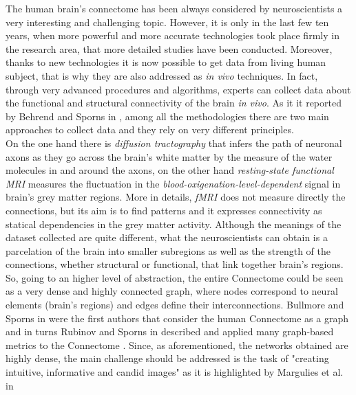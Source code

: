 \documentclass{article}
\begin{document}
\begin{multicols}{2}
The human brain's connectome has been always considered by neuroscientists a very interesting and challenging topic. However, it is only in the last few ten years, when more powerful and more accurate technologies took place firmly in the research area, that more detailed studies have been conducted. Moreover, thanks to new technologies it is now possible to get data from living human subject, that is why they are also addressed as \textit{in vivo} techniques. In fact, through very advanced procedures and algorithms, experts can collect data about the functional and structural connectivity of the brain \textit{in vivo}. As it it reported by Behrend and Sporns in \cite{humanConnectomics}, among all the methodologies there are two main approaches to collect data and they rely on very different principles. \\
On the one hand there is \textit{diffusion tractography} that infers the path of neuronal axons as they go across the brain's white matter by the measure of the water molecules in and around the axons, on the other hand \textit{resting-state functional MRI} measures the fluctuation in the \textit{blood-oxigenation-level-dependent} signal in brain's grey matter regions. More in details, \textit{fMRI} does not measure directly the connections, but its aim is to find patterns and it expresses connectivity as statical dependencies in the grey matter activity. Although the meanings of the dataset collected are quite different, what the neuroscientists can obtain is a parcelation of the brain into smaller subregions as well as the strength of the connections, whether structural or functional, that link together brain's regions. So, going to an higher level of abstraction, the entire Connectome could be seen as a very dense and highly connected graph, where nodes correspond to neural elements (brain's regions) and edges define their interconnections. Bullmore and Sporns in \cite{bullmore2009complex} were the first authors that consider the human Connectome as a graph and in turns Rubinov and Sporns in \cite{complexNetworkMeasures} described and applied many graph-based metrics to the Connectome . Since, as aforementioned, the networks obtained are highly dense, the main challenge should be addressed is the task of "creating intuitive, informative and candid images" as it is highlighted by Margulies et al. in \cite{visualizingHumanConnectome}



\end{multicols}
\end{document}
